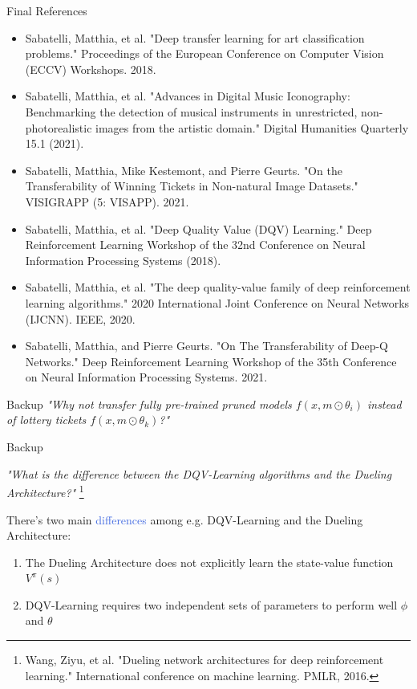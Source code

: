 \documentclass{beamer}
\begin{document}
\begin{frame}{Final References}
	\begin{itemize}
		\fontsize{6pt}{7.2}\selectfont
		\item Sabatelli, Matthia, et al. "Deep transfer learning for art classification problems." Proceedings of the European Conference on Computer Vision (ECCV) Workshops. 2018.
		\item Sabatelli, Matthia, et al. "Advances in Digital Music Iconography: Benchmarking the detection of musical instruments in unrestricted, non-photorealistic images from the artistic domain." Digital Humanities Quarterly 15.1 (2021).
		\item Sabatelli, Matthia, Mike Kestemont, and Pierre Geurts. "On the Transferability of Winning Tickets in Non-natural Image Datasets." VISIGRAPP (5: VISAPP). 2021.
		\item Sabatelli, Matthia, et al. "Deep Quality Value (DQV) Learning." Deep Reinforcement Learning Workshop of the 32nd Conference on Neural Information Processing Systems (2018).
		\item Sabatelli, Matthia, et al. "The deep quality-value family of deep reinforcement learning algorithms." 2020 International Joint Conference on Neural Networks (IJCNN). IEEE, 2020.
		\item Sabatelli, Matthia, and Pierre Geurts. "On The Transferability of Deep-Q Networks." Deep Reinforcement Learning Workshop of the 35th Conference on Neural Information Processing Systems. 2021.
	\end{itemize}

\end{frame}



\appendix

\begin{frame}{Backup}
	\bigskip
	\textit{"Why not transfer fully pre-trained pruned models $f(x,m\odot\theta_i)$ instead of lottery tickets $f(x,m\odot\theta_k)$?"}
	\bigskip
	

\end{frame}

\begin{frame}{Backup}

	\textit{"What is the difference between the DQV-Learning algorithms and the Dueling Architecture?"} \footnote{Wang, Ziyu, et al. "Dueling network architectures for deep reinforcement learning." International conference on machine learning. PMLR, 2016.}

	\bigskip
	
	There's two main \textcolor{RoyalBlue}{differences} among e.g. DQV-Learning and the Dueling Architecture:
	\begin{enumerate}
		\item The Dueling Architecture does not explicitly learn the state-value function $V^{\pi}(s)$
		\item DQV-Learning requires two independent sets of parameters to perform well $\phi$ and $\theta$
	\end{enumerate}

\end{frame}
\end{document}
